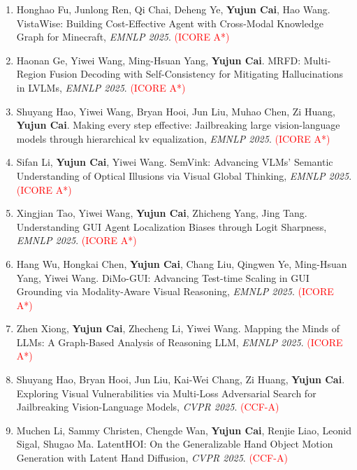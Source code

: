 \documentclass[11pt,letterpaper]{article}
\begin{document}
\begin{enumerate}
\item Honghao Fu, Junlong Ren, Qi Chai, Deheng Ye, \textbf{Yujun Cai}, Hao Wang. VistaWise: Building Cost-Effective Agent with Cross-Modal Knowledge Graph for Minecraft, \textit{EMNLP 2025}. \textcolor{red}{(ICORE A*)}

\item Haonan Ge, Yiwei Wang, Ming-Hsuan Yang, \textbf{Yujun Cai}. MRFD: Multi-Region Fusion Decoding with Self-Consistency for Mitigating Hallucinations in LVLMs, \textit{EMNLP 2025}. \textcolor{red}{(ICORE A*)}

\item Shuyang Hao, Yiwei Wang, Bryan Hooi, Jun Liu, Muhao Chen, Zi Huang, \textbf{Yujun Cai}. Making every step effective: Jailbreaking large vision-language models through hierarchical kv equalization, \textit{EMNLP 2025}. \textcolor{red}{(ICORE A*)}

\item Sifan Li, \textbf{Yujun Cai}, Yiwei Wang. SemVink: Advancing VLMs' Semantic Understanding of Optical Illusions via Visual Global Thinking, \textit{EMNLP 2025}. \textcolor{red}{(ICORE A*)}

\item Xingjian Tao, Yiwei Wang, \textbf{Yujun Cai}, Zhicheng Yang, Jing Tang. Understanding GUI Agent Localization Biases through Logit Sharpness, \textit{EMNLP 2025}. \textcolor{red}{(ICORE A*)}

\item Hang Wu, Hongkai Chen, \textbf{Yujun Cai}, Chang Liu, Qingwen Ye, Ming-Hsuan Yang, Yiwei Wang. DiMo-GUI: Advancing Test-time Scaling in GUI Grounding via Modality-Aware Visual Reasoning, \textit{EMNLP 2025}. \textcolor{red}{(ICORE A*)}

\item Zhen Xiong, \textbf{Yujun Cai}, Zhecheng Li, Yiwei Wang. Mapping the Minds of LLMs: A Graph-Based Analysis of Reasoning LLM, \textit{EMNLP 2025}. \textcolor{red}{(ICORE A*)}

\item Shuyang Hao, Bryan Hooi, Jun Liu, Kai-Wei Chang, Zi Huang, \textbf{Yujun Cai}. Exploring Visual Vulnerabilities via Multi-Loss Adversarial Search for Jailbreaking Vision-Language Models, \textit{CVPR 2025}. \textcolor{red}{(CCF-A)}

\item Muchen Li, Sammy Christen, Chengde Wan, \textbf{Yujun Cai}, Renjie  Liao, Leonid Sigal, Shugao Ma. LatentHOI: On the Generalizable Hand Object Motion Generation with Latent Hand Diffusion, \textit{CVPR 2025}. \textcolor{red}{(CCF-A)}


\end{enumerate}
\end{document}
